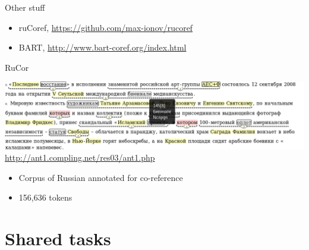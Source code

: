 \documentclass[dvipsnames, 10pt, compress]{beamer}
\begin{document}
\begin{frame}{Other stuff}

\begin{itemize}
   \item ruCoref, \url{https://github.com/max-ionov/rucoref}
   \item BART, \url{http://www.bart-coref.org/index.html}

\end{itemize}

\end{frame}

\begin{frame}{RuCor}

\begin{center}
\includegraphics[width=\textwidth]{graphics/rucoref-pic.png} \\
\url{http://ant1.compling.net/res03/ant1.php}
\end{center}


\begin{itemize}
  \item Corpus of Russian annotated for co-reference
  \item 156,636 tokens

\end{itemize}

\end{frame}


\section{Shared tasks}
\end{document}
